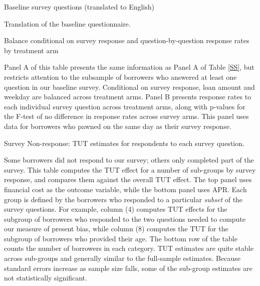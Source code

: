\cleardoublepage

\begin{table}[H]
\caption{Baseline survey questions (translated to English)}
\label{baseline_survey}
\begin{center}
\scriptsize{}
\end{center}
\scriptsize
Translation of the baseline questionnaire.
\end{table}

\cleardoublepage

\begin{table}[H]
\caption{Balance conditional on survey response and question-by-question response rates by treatment arm}
\label{SS_cond_survet}
\begin{center}
\scriptsize{}
\end{center}
\scriptsize

Panel A of this table presents the same information as Panel A of Table \ref{SS}, but restricts attention to the subsample of borrowers who answered at least one question in our baseline survey. Conditional on survey response, loan amount and weekday are balanced across treatment arms. Panel B presents response rates to each individual survey question across treatment arms, along with p-values for the F-test of no difference in response rates across survey arms. This panel uses data for borrowers who pawned on the same day as their survey response. 


\end{table}

\begin{landscape}
\begin{table}[H]
\caption{Survey Non-response: TUT estimates for respondents to each survey question.}
\label{TUT_cond_survet}
\begin{center}
\scriptsize{}
\end{center}
\scriptsize

Some borrowers did not respond to our survey; others only completed part of the survey.
This table computes the TUT effect for a number of sub-groups by survey response, and compares them against the overall TUT effect.
The top panel uses financial cost as the outcome variable, while the bottom panel uses APR.
Each group is defined by the borrowers who responded to a particular \emph{subset} of the survey questions. 
For example, column (4) computes TUT effects for the subgroup of borrowers who responded to the two questions needed to compute our measure of present bias, while column (8) computes the TUT for the subgroup of borrowers who provided their age.
The bottom row of the table counts the number of borrowers in each category.
TUT estimates are quite stable across sub-groups and generally similar to the full-sample estimates.
Because standard errors increase as sample size falls, some of the sub-group estimates are not statistically significant.
\end{table}
\end{landscape}


